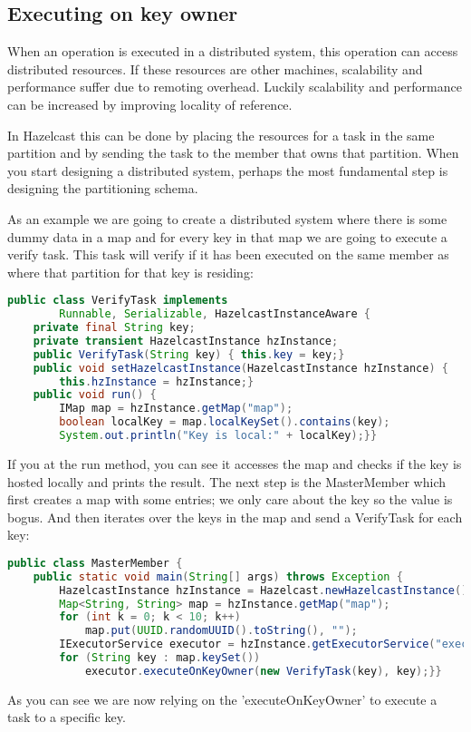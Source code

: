 \subsection{Executing on key owner}
When an operation is executed in a distributed system, this operation can access distributed resources. If these resources are other machines, scalability and performance suffer due to remoting overhead. Luckily scalability and performance can be increased by improving locality of reference.

In Hazelcast this can be done by placing the resources for a task in the same partition and by sending the task to the member that owns that partition. When you start designing a distributed system, perhaps the most fundamental step is designing the partitioning schema.

As an example we are going to create a distributed system where there is some dummy data in a map and for every key in that map we are going to execute a verify task. This task will verify if it has been executed on the same member as where that partition for that key is residing:
\begin{lstlisting}[language=java]
public class VerifyTask implements
        Runnable, Serializable, HazelcastInstanceAware {
    private final String key;
    private transient HazelcastInstance hzInstance;
    public VerifyTask(String key) { this.key = key;}
    public void setHazelcastInstance(HazelcastInstance hzInstance) {
        this.hzInstance = hzInstance;}
    public void run() {
        IMap map = hzInstance.getMap("map");
        boolean localKey = map.localKeySet().contains(key);
        System.out.println("Key is local:" + localKey);}}
\end{lstlisting}
If you at the run method, you can see it accesses the map and checks if the key is hosted locally and prints the result. The next step is the MasterMember which first creates a map with some entries; we only care about the key so the value is bogus. And then iterates over the keys in the map and send a VerifyTask for each key:
\begin{lstlisting}[language=java]
public class MasterMember {
    public static void main(String[] args) throws Exception {
        HazelcastInstance hzInstance = Hazelcast.newHazelcastInstance();
        Map<String, String> map = hzInstance.getMap("map");
        for (int k = 0; k < 10; k++)
            map.put(UUID.randomUUID().toString(), "");
        IExecutorService executor = hzInstance.getExecutorService("executor");
        for (String key : map.keySet())
            executor.executeOnKeyOwner(new VerifyTask(key), key);}}
\end{lstlisting}
As you can see we are now relying on the 'executeOnKeyOwner' to execute a task to a specific key. 

